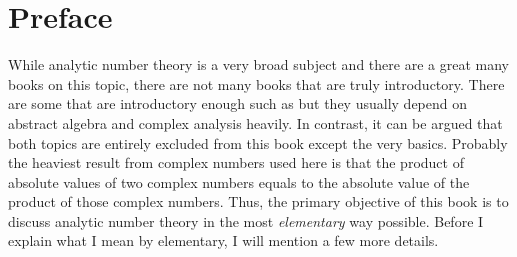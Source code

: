\documentclass[12pt, leqno]{book}
\theoremstyle{definition}
\begin{document}
	\section*{Preface}
	While analytic number theory is a very broad subject and there are a great many books on this topic, there are not many books that are truly introductory. There are some that are introductory enough such as \textcite{apostol_1976} but they usually depend on abstract algebra and complex analysis heavily. In contrast, it can be argued that both topics are entirely excluded from this book except the very basics. Probably the heaviest result from complex numbers used here is that the product of absolute values of two complex numbers equals to the absolute value of the product of those complex numbers. Thus, the primary objective of this book is to discuss analytic number theory in the most \textit{elementary} way possible. Before I explain what I mean by elementary, I will mention a few more details.
\end{document}
